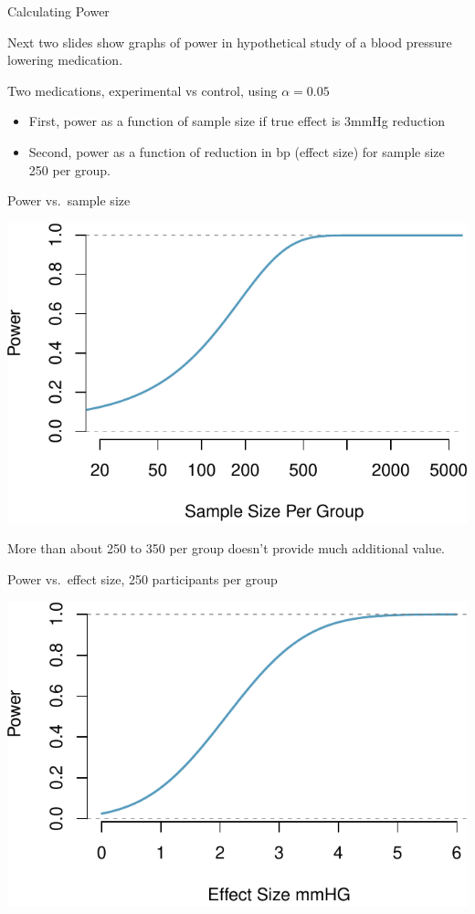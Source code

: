 \documentclass[ignorenonframetext,]{beamer}
\begin{document}
\begin{frame}{Calculating Power}

Next two slides show graphs of power in hypothetical study of a blood
pressure lowering medication. \medskip

Two medications, experimental vs control, using \(\alpha = 0.05\)

\begin{itemize}
\item
  First, power as a function of sample size if true effect is 3mmHg
  reduction
\item
  Second, power as a function of reduction in bp (effect size) for
  sample size 250 per group.
\end{itemize}

\end{frame}

\begin{frame}{Power vs.~sample size}

\includegraphics{resident_course_2017_dph_files/figure-beamer/power_sample-1.pdf}

More than about 250 to 350 per group doesn't provide much additional
value.

\end{frame}

\begin{frame}{Power vs.~effect size, 250 participants per group}

\includegraphics{resident_course_2017_dph_files/figure-beamer/power_effect-1.pdf}

\end{frame}
\end{document}
